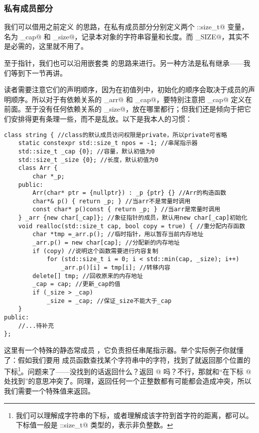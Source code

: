 \subsubsection*{私有成员部分}
我们可以借用之前定义 \lstinline@valarri@ 的思路，在私有成员部分分别定义两个 \lstinline@std::size_t@ 变量，名为 \lstinline@_cap@ 和 \lstinline@_size@，记录本对象的字符串容量和长度。而 \lstinline@MAX_SIZE@，其实不是必需的，这里就不用了。\par
至于指针，我们也可以沿用嵌套类 \lstinline@Arr@ 的思路来进行。另一种方法是私有继承——我们等到下一节再讲。\par
读者需要注意它们的声明顺序，因为在初值列中，初始化的顺序会取决于成员的声明顺序。所以对于有依赖关系的 \lstinline@_arr@ 和 \lstinline@_cap@，要特别注意把 \lstinline@_cap@ 定义在前面。至于没有任何依赖关系的 \lstinline@_size@，放在哪里都行；但我们还是倾向于把它们安排得更有条理一些，而不是乱放。以下是我本人的习惯：
\begin{lstlisting}
class string { //class的默认成员访问权限是private，所以private可省略
    static constexpr std::size_t npos = -1; //串尾指示器
    std::size_t _cap {0}; //容量，默认初值为0
    std::size_t _size {0}; //长度，默认初值为0
    class Arr {
        char *_p;
    public:
        Arr(char* ptr = {nullptr}) : _p {ptr} {} //Arr的构造函数
        char*& p() { return _p; } //当arr不是常量时调用
        const char* p()const { return _p; } //当arr是常量时调用
    } _arr {new char[_cap]}; //象征指针的成员，默认用new char[_cap]初始化
    void realloc(std::size_t cap, bool copy = true) { //重分配内存函数
        char *tmp =_arr.p(); //临时指针，用以暂存当前内存地址
        _arr.p() = new char[cap]; //分配新的内存地址
        if (copy) //说明这个函数需要进行内容复制
            for (std::size_t i = 0; i < std::min(cap, _size); i++)
                _arr.p()[i] = tmp[i]; //转移内容
        delete[] tmp; //回收原来的内存地址
        _cap = cap; //更新_cap的值
        if (_size > _cap)
            _size = _cap; //保证_size不能大于_cap
    }
public:
    //...待补充
};
\end{lstlisting}
这里有一个特殊的静态常成员 \lstinline@npos@，它负责担任串尾指示器。举个实际例子你就懂了：假如我们要用 \lstinline@find@ 成员函数查找某个字符串中的字符，找到了就返回那个位置的下标\footnote{我们可以理解成字符串的下标，或者理解成该字符到首字符的距离，都可以。下标值一般是 \lstinline@std::size_t@ 类型的，表示非负整数。}。问题来了——没找到的话返回什么？返回 @ 吗？不行，那就和``在下标 @ 处找到''的意思冲突了。同理，返回任何一个正整数都有可能都会造成冲突，所以我们需要一个特殊值来返回。\par
